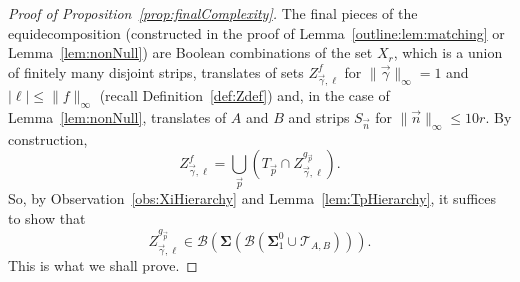 \documentclass[12pt,a4paper]{amsart}
\numberwithin{equation}{section}
\newcommand{\bSigma}{\boldsymbol{\Sigma}}
\newcommand{\bB}{\boldsymbol{\mathcal{B}}}
\theoremstyle{definition}
\begin{document}
\begin{proof}[Proof of Proposition~\ref{prop:finalComplexity}]
The final pieces of the equidecomposition (constructed in the proof of Lemma~\ref{outline:lem:matching} or Lemma~\ref{lem:nonNull}) are Boolean combinations of the set $X_r$, which is a union of finitely many disjoint strips, translates of sets $Z^{f}_{\vec{\gamma},\ell}$ for $\|\vec{\gamma}\|_\infty=1$ and $|\ell|\leq \|f\|_\infty$ (recall Definition~\ref{def:Zdef}) and, in the case of Lemma~\ref{lem:nonNull}, translates of $A$ and $B$ and strips $S_{\vec{n}}$ for $\|\vec{n}\|_\infty \leq 10r$. By construction, 
\[Z_{\vec{\gamma},\ell}^f = \bigcup_{\vec{p}}\left(T_{\vec{p}}\cap Z^{g_{\vec{p}}}_{\vec{\gamma},\ell}\right).\]
So, by Observation~\ref{obs:XiHierarchy} and Lemma~\ref{lem:TpHierarchy}, it suffices to show that 
\[Z_{\vec{\gamma},\ell}^{g_{\vec{p}}}\in \bB\left(\bSigma\left(\bB\left(\bSigma_1^0\cup \mathcal{T}_{A,B}\right)\right)\right).\]
This is what we shall prove.


\end{proof}
\end{document}
